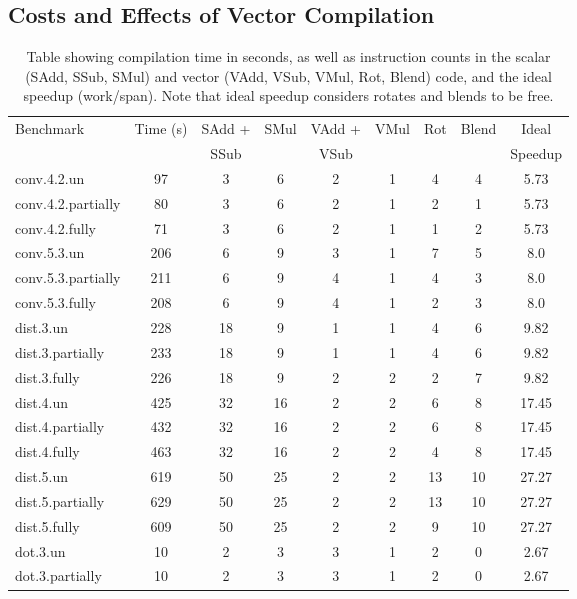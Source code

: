 \subsection{Costs and Effects of Vector Compilation}\label{sec:compilation-stuff}

\begin{table}
	\small
    \caption{Table showing compilation time in seconds, as well as instruction counts in the scalar (SAdd, SSub, SMul) and vector (VAdd, VSub, VMul, Rot, Blend) code, and the ideal speedup (work/span). Note that ideal speedup considers rotates and blends to be free.}\label{tab:big-ass}
    \begin{tabular}{lcccccccc}
    \toprule
    Benchmark & Time (s) & SAdd +& SMul & VAdd + & VMul & Rot & Blend & Ideal \\
    & & SSub & & VSub & & & & Speedup\\\midrule
    conv.4.2.un & 97 & 3 & 6 & 2 & 1 & 4 & 4 & 5.73\\
    conv.4.2.partially & 80 & 3 & 6 & 2 & 1 & 2 & 1 & 5.73\\
    conv.4.2.fully & 71 & 3 & 6 & 2 & 1 & 1 & 2 & 5.73\\
    \midrule
    conv.5.3.un & 206 & 6 & 9 & 3 & 1 & 7 & 5 & 8.0\\
    conv.5.3.partially & 211 & 6 & 9 & 4 & 1 & 4 & 3 & 8.0\\
    conv.5.3.fully & 208 & 6 & 9 & 4 & 1 & 2 & 3 & 8.0\\
    \midrule
    dist.3.un & 228 & 18 & 9 & 1 & 1 & 4 & 6 & 9.82\\
    dist.3.partially & 233 & 18 & 9 & 1 & 1 & 4 & 6 & 9.82\\
    dist.3.fully & 226 & 18 & 9 & 2 & 2 & 2 & 7 & 9.82\\
    \midrule
    dist.4.un & 425 & 32 & 16 & 2 & 2 & 6 & 8 & 17.45\\
    dist.4.partially & 432 & 32 & 16 & 2 & 2 & 6 & 8 & 17.45\\
    dist.4.fully & 463 & 32 & 16 & 2 & 2 & 4 & 8 & 17.45\\
    \midrule
    dist.5.un & 619 & 50 & 25 & 2 & 2 & 13 & 10 & 27.27\\
    dist.5.partially & 629 & 50 & 25 & 2 & 2 & 13 & 10 & 27.27\\
    dist.5.fully & 609 & 50 & 25 & 2 & 2 & 9 & 10 & 27.27\\
    \midrule
    dot.3.un & 10 & 2 & 3 & 3 & 1 & 2 & 0 & 2.67\\
    dot.3.partially & 10 & 2 & 3 & 3 & 1 & 2 & 0 & 2.67\\

\end{tabular}
\end{table}
